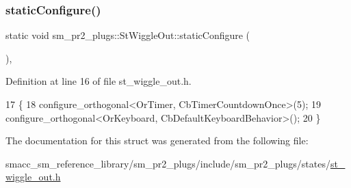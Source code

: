 \subsubsection{\texorpdfstring{static\+Configure()}{staticConfigure()}}
{\footnotesize\ttfamily static void sm\+\_\+pr2\+\_\+plugs\+::\+St\+Wiggle\+Out\+::static\+Configure (\begin{DoxyParamCaption}{ }\end{DoxyParamCaption})\hspace{0.3cm}{\ttfamily [inline]}, {\ttfamily [static]}}



Definition at line 16 of file st\+\_\+wiggle\+\_\+out.\+h.


\begin{DoxyCode}
17     \{
18         configure\_orthogonal<OrTimer,  CbTimerCountdownOnce>(5);    
19         configure\_orthogonal<OrKeyboard, CbDefaultKeyboardBehavior>();
20     \}
\end{DoxyCode}


The documentation for this struct was generated from the following file\+:\begin{DoxyCompactItemize}
\item 
smacc\+\_\+sm\+\_\+reference\+\_\+library/sm\+\_\+pr2\+\_\+plugs/include/sm\+\_\+pr2\+\_\+plugs/states/\hyperlink{st__wiggle__out_8h}{st\+\_\+wiggle\+\_\+out.\+h}\end{DoxyCompactItemize}
